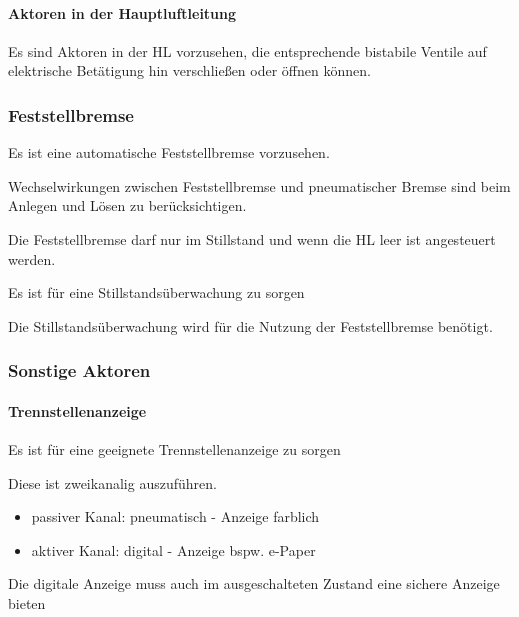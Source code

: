 \paragraph{Aktoren in der Hauptluftleitung}
\begin{feat}
Es sind Aktoren in der \acrshort{HL} vorzusehen, die entsprechende bistabile Ventile auf elektrische Betätigung hin verschließen oder öffnen können.
\end{feat}

\subsubsection{Feststellbremse}
\begin{feat}
Es ist eine automatische Feststellbremse vorzusehen.
\end{feat}
\begin{feat}
Wechselwirkungen zwischen Feststellbremse und pneumatischer Bremse sind beim Anlegen und Lösen zu berücksichtigen.
\end{feat}
\begin{rem}[zu Anf. 20]
Die Feststellbremse darf nur im Stillstand und wenn die HL leer ist angesteuert werden.
\end{rem}
\begin{feat}
Es ist für eine Stillstandsüberwachung zu sorgen
\end{feat}
\begin{rem}[zu Anf. 20]
Die Stillstandsüberwachung wird für die Nutzung der Feststellbremse benötigt.
\end{rem}

\subsubsection{Sonstige Aktoren}
\paragraph{Trennstellenanzeige}
\begin{feat}
Es ist für eine geeignete Trennstellenanzeige zu sorgen
\end{feat}
\begin{rem}[zu Anf. 22]
Diese ist zweikanalig auszuführen.
\begin{itemize}
    \item passiver Kanal: pneumatisch - Anzeige farblich
    \item aktiver Kanal: digital - Anzeige bspw. e-Paper
\end{itemize}
\end{rem}
\begin{feat}
Die digitale Anzeige muss auch im ausgeschalteten Zustand eine sichere Anzeige bieten
\end{feat}
